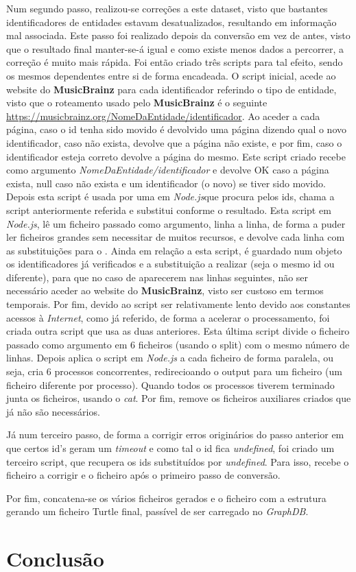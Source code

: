 \documentclass{article}
\begin{document}
Num segundo passo, realizou-se correções a este dataset, visto que bastantes identificadores de entidades estavam desatualizados, resultando em informação mal associada. Este passo foi realizado depois da conversão em vez de antes, visto que o resultado final manter-se-á igual e como existe menos dados a percorrer, a correção é muito mais rápida. Foi então criado três scripts para tal efeito, sendo os mesmos dependentes entre si de forma encadeada. O script inicial, acede ao website do \textbf{MusicBrainz} para cada identificador referindo o tipo de entidade, visto que o roteamento usado pelo \textbf{MusicBrainz} é o seguinte \url{https://musicbrainz.org/NomeDaEntidade/identificador}. Ao aceder a cada página, caso o id tenha sido movido é devolvido uma página dizendo qual o novo identificador, caso não exista, devolve que a página não existe, e por fim, caso o identificador esteja correto devolve a página do mesmo. Este script criado recebe como argumento \textit{NomeDaEntidade/identificador} e devolve OK caso a página exista, null caso não exista e um identificador (o novo) se tiver sido movido. Depois esta script é usada por uma em \textit{Node.js}que procura pelos ids, chama a script anteriormente referida e substitui conforme o resultado. Esta script em \textit{Node.js}, lê um ficheiro passado como argumento, linha a linha, de forma a puder ler ficheiros grandes sem necessitar de muitos recursos, e devolve cada linha com as substituições para o . Ainda em relação a esta script, é guardado num objeto os identificadores já verificados e a substituição a realizar (seja o mesmo id ou diferente), para que no caso de aparecerem nas linhas seguintes, não ser necessário aceder ao website do \textbf{MusicBrainz}, visto ser custoso em termos temporais. Por fim, devido ao script ser relativamente lento devido aos constantes acessos à \textit{Internet}, como já referido, de forma a acelerar o processamento, foi criada outra script que usa as duas anteriores. Esta última script divide o ficheiro passado como argumento em 6 ficheiros (usando o split) com o mesmo número de linhas. Depois aplica o script em \textit{Node.js} a cada ficheiro de forma paralela, ou seja, cria 6 processos concorrentes, redirecioando o output para um ficheiro (um ficheiro diferente por processo). Quando todos os processos tiverem terminado junta os ficheiros, usando o \textit{cat}. Por fim, remove os ficheiros auxiliares criados que já não são necessários.

Já num terceiro passo, de forma a corrigir erros originários do passo anterior em que certos id's geram um \textit{timeout} e como tal o id fica \textit{undefined}, foi criado um terceiro script, que recupera os ids substituídos por \textit{undefined}. Para isso, recebe o ficheiro a corrigir e o ficheiro após o primeiro passo de conversão. 

Por fim, concatena-se os vários ficheiros gerados e o ficheiro com a estrutura gerando um ficheiro Turtle final, passível de ser carregado no \textit{GraphDB}.

\section{Conclusão}

\newpage 
\printbibliography

\begin{appendices}

\end{appendices}
\end{document}
